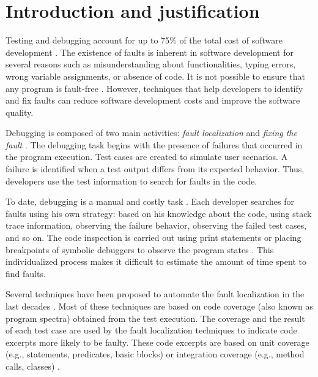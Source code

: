 \documentclass[12pt,a4paper,espaco=umemeio,noindentfirst,oneside,openany,tocpage=plain,pnumromarab,ruledheader,time,anapcustomindent]{sty/abnt}
\begin{document}
\tableofcontents

\section{Introduction and justification}
\label{intro}

Testing and debugging account for up to 75\% of the total cost of software development \cite{hailpern2002,tassey2002}.
The existence of faults is inherent in software development for several reasons such as misunderstanding about 
functionalities, typing errors, wrong variable assignments, or absence of code. It is not possible to ensure that any 
program is fault-free \cite{jones2007}. However, techniques that help developers to identify and fix faults can reduce 
software development costs and improve the software quality.

Debugging is composed of two main activities: \textit{fault localization} and \textit{fixing the fault} \cite{Myers2004}. 
The debugging task begins with the presence of failures that occurred in the program execution. Test cases are created to 
simulate user scenarios. A failure is identified when a test output differs from its expected behavior. Thus, developers 
use the test information to search for faults in the code.

To date, debugging is a manual and costly task \cite{jones2007}. Each developer searches for faults using his own strategy: 
based on his knowledge about the code, using stack trace information, observing the failure behavior, observing the 
failed test cases, and so on. The code inspection is carried out using print statements or placing breakpoints of 
symbolic debuggers to observe the program states \cite{jones2007}. This individualized process makes it difficult to 
estimate the amount of time spent to find faults.

Several techniques have been proposed to automate the fault localization in the last decades 
\cite{mariani2011,naish2010,santelices2009,masri2010,burger2008}. Most of these techniques 
are based on code coverage (also known as program spectra) obtained from the test execution. The coverage and the result 
of each test case are used by the fault localization techniques to indicate code excerpts more likely to be faulty. These code 
excerpts are based on unit coverage (e.g., statements, predicates, basic blocks) \cite{wong2010,jones2002} or integration 
coverage (e.g., method calls, classes) \cite{mariani2011,souza2012b,souza2013}.
\end{document}
